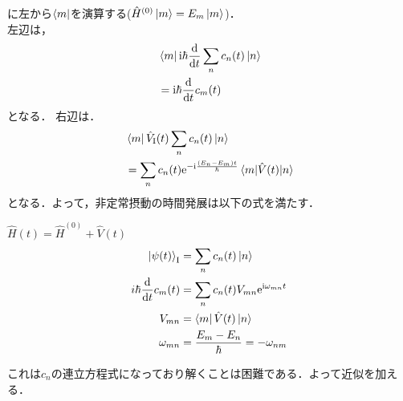 \documentclass{report}
\begin{document}
  に左から$\bra{m}$を演算する($\hat{H}^{(0)}\ket{m} = E_m\ket{m}$)．\\
  左辺は，
  \begin{align}
    &\bra{m}\mathrm{i}\hbar\dv{t}\sum_{n}c_n(t)\ket{n}\\
    & = \mathrm{i}\hbar\dv{t}c_m(t)
  \end{align}
  となる．
  右辺は．
  \begin{align}
    &\bra{m}\hat{V}_{\mathrm{I}}(t)\sum_{n}c_n(t)\ket{n}\\
    & = \sum_{n}c_n(t)\mathrm{e}^{-\mathrm{i}\frac{(E_n - E_m)t}{\hbar}}\mel{m}{\hat{V}(t)}{n}
  \end{align}
  となる．よって，非定常摂動の時間発展は以下の式を満たす．
  \begin{itembox}[l]{$\hat{H}(t) = \hat{H}^{(0)} + \hat{V}(t)$}
    \begin{align}
      \ket{\psi(t)}_{\mathrm{I}} &= \sum_{n}c_n(t)\ket{n}\\
      i\hbar\dv{t}c_m(t) &= \sum_{n}c_n(t)V_{mn}\mathrm{e}^{\mathrm{i}\omega_{mn}t}\\
      V_{mn} &= \bra{m}\hat{V}(t)\ket{n}\\
      \omega_{mn} &= \frac{E_m - E_n}{\hbar} = -\omega_{nm}
    \end{align}
  \end{itembox}
  これは$c_n$の連立方程式になっており解くことは困難である．よって近似を加える．
\end{document}
